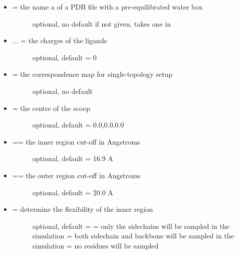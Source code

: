\documentclass[letterpaper,10pt,english]{sphinxmanual}
\begin{document}
\begin{itemize}
\item {} \begin{description}
\item[{ = the name a of a PDB file with a pre-equilibrated water box}] \leavevmode
optional, no default
if not given, takes one in 

\end{description}

\item {} \begin{description}
\item[{ ... = the charges of the ligands}] \leavevmode
optional, default = 0

\end{description}

\item {} \begin{description}
\item[{ = the correspondence map for single-topology setup}] \leavevmode
optional, no default

\end{description}

\item {} \begin{description}
\item[{ = the centre of the scoop}] \leavevmode
optional, default = 0.0,0.0,0.0

\end{description}

\item {} \begin{description}
\item[{ == the inner region cut-off in Angstroms}] \leavevmode
optional, default = 16.9 A

\end{description}

\item {} \begin{description}
\item[{ == the outer region cut-off in Angstroms}] \leavevmode
optional, default = 20.0 A

\end{description}

\item {} \begin{description}
\item[{ = determine the flexibility of the inner region}] \leavevmode
optional, default = 
 = only the sidechains will be sampled in the simulation
 = both sidechain and backbone will be sampled in the simulation
 = no residues will be sampled


\end{description}
\end{itemize}
\end{document}
